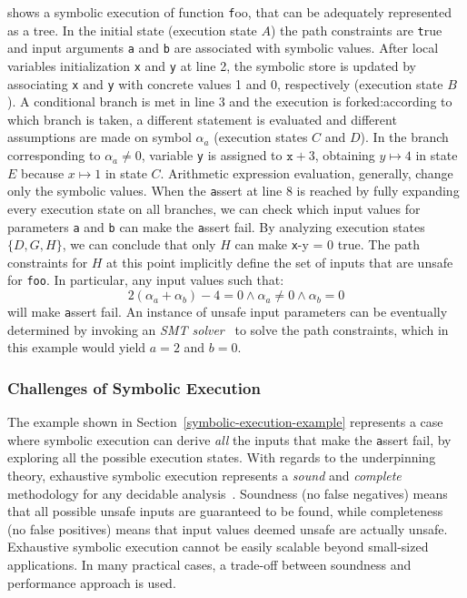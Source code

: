 \noindent {} shows a symbolic execution of function {\texttt foo}, that can be adequately represented as a tree. In the initial state (execution state $A$) the path constraints are {\texttt true} and input arguments {\texttt a} and {\texttt b} are associated with symbolic values. 
After local variables initialization {\texttt x} and {\texttt y} at line 2, the symbolic store is updated by associating {\texttt x} and {\texttt y} with concrete values 1 and 0, respectively (execution state $B$). A conditional branch is met in line 3 and the execution is forked:according to which branch is taken, a different statement is evaluated and different assumptions are made on symbol $\alpha_a$ (execution states $C$ and $D$). In the branch corresponding to $\alpha_a\neq 0$, variable {\texttt y} is assigned to  ${\texttt x}+3$, obtaining $y\mapsto 4$ in state $E$ because $x\mapsto 1$ in state $C$. Arithmetic expression evaluation, generally, change only the symbolic values.
When the {\texttt assert} at line 8 is reached by fully expanding every execution state  on all branches, we can check which input values for parameters {\texttt a} and {\texttt b} can make the {\texttt assert} fail. By analyzing execution states $\{D,G,H\}$, we can conclude that only $H$ can make {\texttt x-y = 0} true. The path constraints for $H$ at this point implicitly define the set of inputs that are unsafe for \texttt{foo}. 
In particular, any input values such that:
\[ 2(\alpha_a+\alpha_b)-4 = 0 \wedge \alpha_a \neq 0 \wedge \alpha_b = 0 \]
will make {\texttt assert} fail. An instance of unsafe input parameters can be eventually determined by invoking an {\em SMT solver}~\cite{BKM14} to solve the path constraints, which in this example would yield $a = 2$ and $b = 0$.

\subsubsection{Challenges of Symbolic Execution}
\label{example-discussion}

The example shown in Section~\ref{symbolic-execution-example} represents a case where symbolic execution can derive {\em all} the inputs that make the {\texttt assert} fail, by exploring all the possible execution states. With regards to the underpinning theory, exhaustive symbolic execution represents a {\em sound} and {\em complete} methodology for any decidable analysis~\cite{Baldoni:2018:SSE:3212709.3182657}. Soundness (no false negatives) means that all possible unsafe inputs are guaranteed to be found, while completeness (no false positives) means that  input values deemed unsafe are actually unsafe. Exhaustive symbolic execution cannot be easily scalable beyond small-sized applications. In many practical cases, a trade-off between soundness and performance approach is used.

